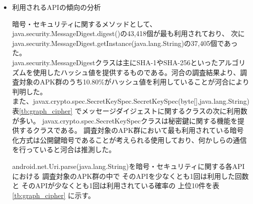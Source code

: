 \begin{itemize}
\item 利用されるAPIの傾向の分析


暗号・セキュリティに関するメソッドとして、
java.security.MessageDigest.digest()の43,418個が最も利用されており、
次にjava.security.MessageDigest.getInstance(java.lang.String)の37,405個であった。
\\java.security.MessageDigestクラスは主にSHA-1やSHA-256といったアルゴリズムを使用したハッシュ値を提供するものである。河合の調査結果より、調査対象のAPK群のうち10.80\%がハッシュ値を利用していることが河合により判明した。
\\また、javax.crypto.spec.SecretKeySpec.SecretKeySpec(byte[],java.lang.String)表\ref{tb:graph_cipher}
でメッセージダイジェストに関するクラスの次に利用数が多い。
javax.crypto.spec.SecretKeySpecクラスは秘密鍵に関する機能を提供するクラスである。
調査対象のAPK群において最も利用されている暗号化方式は公開鍵暗号であることが考えられる使用しており、何かしらの通信を行っていると河合は推測した。

android.net.Uri.parse(java.lang.String)を暗号・セキュリティに関する各APIにおける
調査対象のAPK群の中で
そのAPIを少なくとも1回は利用した回数と
そのAPIが少なくとも1回は利用されている確率の
上位10件を表\ref{tb:graph_cipher}
に示す。


\end{itemize}


